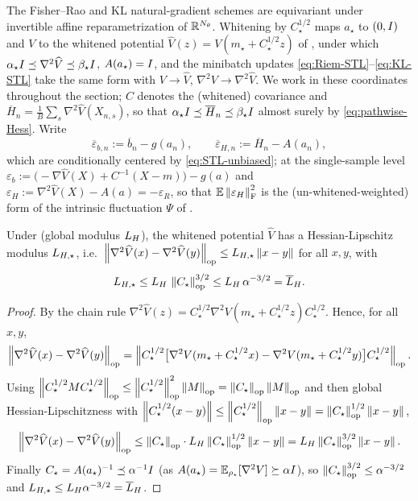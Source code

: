 The Fisher--Rao and KL natural-gradient schemes are equivariant under invertible affine
reparametrization of $\mathbb{R}^{N_\theta}$. Whitening by $C_\star^{1/2}$ maps $a_\star$ to $(0,I)$ and
$V$ to the whitened potential $\widehat V(z)=V(m_\star+C_\star^{1/2}z)$ of , under
which $\alpha_\star I\preceq\nabla^2\widehat V\preceq\beta_\star I$, $A(a_\star)=I$, and the
minibatch updates \eqref{eq:Riem-STL}--\eqref{eq:KL-STL} take the same form with $V\to\widehat V$,
$\nabla^2 V\to\nabla^2\widehat V$. We work in these coordinates throughout the section; $C$ denotes
the (whitened) covariance and $\overline H_n=\tfrac1B\sum_s\nabla^2\widehat V(X_{n,s})$, so that
$\alpha_\star I\preceq\overline H_n\preceq\beta_\star I$ almost surely by \eqref{eq:pathwise-Hess}.
Write
\[
    \overline\varepsilon_{b,n}:=\overline b_n-g(a_n),\qquad
    \overline\varepsilon_{H,n}:=\overline H_n-A(a_n),
\]
which are conditionally centered by \eqref{eq:STL-unbiased}; at the single-sample level
$\varepsilon_b:=\bigl(-\nabla\widehat V(X)+C^{-1}(X-m)\bigr)-g(a)$ and
$\varepsilon_H:=\nabla^2\widehat V(X)-A(a)=-\varepsilon_R$, so that
$\mathbb{E}\left\lVert \varepsilon_H\right\rVert_{\mathrm{F}}^2$ is the (un-whitened-weighted) form of the intrinsic fluctuation
$\Psi$ of .

\begin{lemma}
\label{lem:whitened-HessLip}
Under  (global modulus $L_H$), the whitened potential $\widehat V$ has a
Hessian-Lipschitz modulus $L_{H,\star}$, i.e.\
$\left\lVert \nabla^2\widehat V(x)-\nabla^2\widehat V(y)\right\rVert_{\mathrm{op}}\leq L_{H,\star}\left\lVert x-y\right\rVert$ for all $x,y$, with
\[
    L_{H,\star}\leq L_H\,\left\lVert C_\star\right\rVert_{\mathrm{op}}^{3/2}\leq L_H\,\alpha^{-3/2}=\overline{L}_H .
\]
\end{lemma}

\begin{proof}
By the chain rule $\nabla^2\widehat V(z)=C_\star^{1/2}\nabla^2 V(m_\star+C_\star^{1/2}z)C_\star^{1/2}$.
Hence, for all $x,y$,
\[
    \left\lVert \nabla^2\widehat V(x)-\nabla^2\widehat V(y)\right\rVert_{\mathrm{op}}
    =\left\lVert C_\star^{1/2}\bigl[\nabla^2V(m_\star+C_\star^{1/2}x)-\nabla^2V(m_\star+C_\star^{1/2}y)\bigr]C_\star^{1/2}\right\rVert_{\mathrm{op}}.
\]
Using $\left\lVert C_\star^{1/2}MC_\star^{1/2}\right\rVert_{\mathrm{op}}\leq\left\lVert C_\star^{1/2}\right\rVert_{\mathrm{op}}^2\left\lVert M\right\rVert_{\mathrm{op}}=\left\lVert C_\star\right\rVert_{\mathrm{op}}\left\lVert M\right\rVert_{\mathrm{op}}$
and then global Hessian-Lipschitzness with
$\left\lVert C_\star^{1/2}(x-y)\right\rVert\leq\left\lVert C_\star^{1/2}\right\rVert_{\mathrm{op}}\left\lVert x-y\right\rVert=\left\lVert C_\star\right\rVert_{\mathrm{op}}^{1/2}\left\lVert x-y\right\rVert$,
\[
    \left\lVert \nabla^2\widehat V(x)-\nabla^2\widehat V(y)\right\rVert_{\mathrm{op}}
    \leq\left\lVert C_\star\right\rVert_{\mathrm{op}}\cdot L_H\left\lVert C_\star\right\rVert_{\mathrm{op}}^{1/2}\left\lVert x-y\right\rVert
    =L_H\left\lVert C_\star\right\rVert_{\mathrm{op}}^{3/2}\left\lVert x-y\right\rVert.
\]
Finally $C_\star=A(a_\star)^{-1}\preceq\alpha^{-1}I$ (as $A(a_\star)=\mathbb{E}_{\rho_\star}[\nabla^2V]\succeq\alpha I$),
so $\left\lVert C_\star\right\rVert_{\mathrm{op}}^{3/2}\leq\alpha^{-3/2}$ and $L_{H,\star}\leq L_H\alpha^{-3/2}=\overline{L}_H$.
\end{proof}

